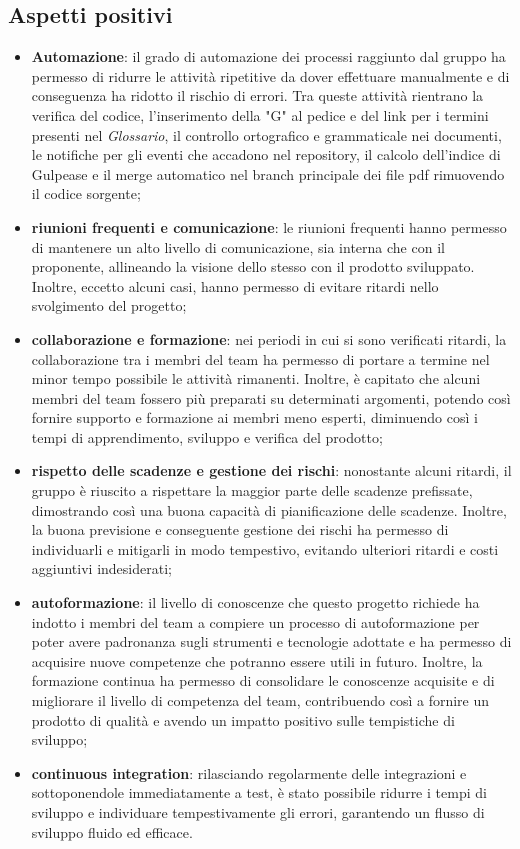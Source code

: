 \subsection{Aspetti positivi}
\begin{itemize}
    \item \textbf{Automazione}: il grado di automazione dei processi raggiunto dal gruppo ha permesso di ridurre le attività ripetitive da dover effettuare manualmente e di conseguenza ha ridotto il rischio di errori. Tra queste attività rientrano la verifica del codice, l'inserimento della "G" al pedice e del link per i termini presenti nel \textit{Glossario}, il controllo ortografico e grammaticale nei documenti, le notifiche per gli eventi che accadono nel repository, il calcolo dell'indice di Gulpease e il merge automatico nel branch principale dei file pdf rimuovendo il codice sorgente;
    \item \textbf{riunioni frequenti e comunicazione}: le riunioni frequenti hanno permesso di mantenere un alto livello di comunicazione, sia interna che con il proponente, allineando la visione dello stesso con il prodotto sviluppato. Inoltre, eccetto alcuni casi, hanno permesso di evitare ritardi nello svolgimento del progetto;
    \item \textbf{collaborazione e formazione}: nei periodi in cui si sono verificati ritardi, la collaborazione tra i membri del team ha permesso di portare a termine nel minor tempo possibile le attività rimanenti. Inoltre, è capitato che alcuni membri del team fossero più preparati su determinati argomenti, potendo così fornire supporto e formazione ai membri meno esperti, diminuendo così i tempi di apprendimento, sviluppo e verifica del prodotto;
    \item \textbf{rispetto delle scadenze e gestione dei rischi}: nonostante alcuni ritardi, il gruppo è riuscito a rispettare la maggior parte delle scadenze prefissate, dimostrando così una buona capacità di pianificazione delle scadenze. Inoltre, la buona previsione e conseguente gestione dei rischi ha permesso di individuarli e mitigarli in modo tempestivo, evitando ulteriori ritardi e costi aggiuntivi indesiderati;
    \item \textbf{autoformazione}: il livello di conoscenze che questo progetto richiede ha indotto i membri del team a compiere un processo di autoformazione per poter avere padronanza sugli strumenti e tecnologie adottate e ha permesso di acquisire nuove competenze che potranno essere utili in futuro. Inoltre, la formazione continua ha permesso di consolidare le conoscenze acquisite e di migliorare il livello di competenza del team, contribuendo così a fornire un prodotto di qualità e avendo un impatto positivo sulle tempistiche di sviluppo;
    \item \textbf{continuous integration}: rilasciando regolarmente delle integrazioni e sottoponendole immediatamente a test, è stato possibile ridurre i tempi di sviluppo e individuare tempestivamente gli errori, garantendo un flusso di sviluppo fluido ed efficace.
\end{itemize}

